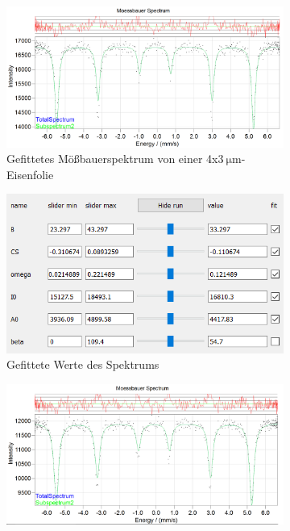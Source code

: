 \documentclass[german, %
parskip=full, %
bibliography=totoc, %
]{scrartcl}
\begin{document}
\begin{figure}[ht]
	\centering
	\begin{subfigure}[b]{0.5\textwidth}
		\includegraphics[width=\textwidth]{MoessbauerEisen4x3reinB}
	  \caption{Gefittetes Mößbauerspektrum von einer 4x\(\SI{3}{\micro\meter}\)-Eisenfolie}
	  \label{fig:moess4x3nB}
  \end{subfigure}
  \begin{subfigure}[b]{0.4\textwidth}
	  \includegraphics[width=\textwidth]{WerteEisen4x3reinB}
	  \caption{Gefittete Werte des Spektrums}
	  \label{fig:werte4x3nB}
  \end{subfigure}
	\begin{subfigure}[b]{0.5\textwidth}
		\includegraphics[width=\textwidth]{MoessbauerEisen25reinB}

\end{subfigure}
\end{figure}
\end{document}
